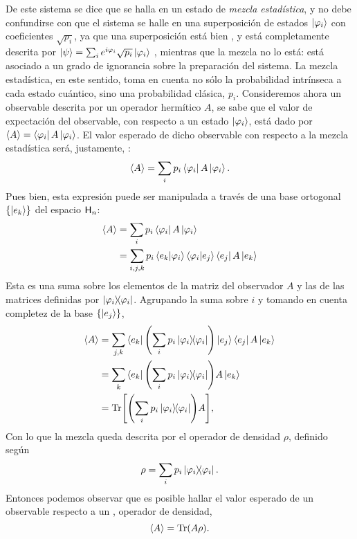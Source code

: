 De este sistema se dice que se halla en un estado de \textit{mezcla estadística}, y no debe confundirse con que el sistema se halle en una superposición de estados $\ket{\varphi_{i}}$ con coeficientes $\sqrt{p_{i}}$, ya que una superposición está bien , y está completamente descrita por $\ket{\psi}=\sum_{i} e^{i \varphi_i} \sqrt{p_{i}}\ket{\varphi_{i}}$ , mientras que la mezcla no lo está:  está asociado a un grado de ignorancia sobre la preparación del sistema. La mezcla estadística, en este sentido, toma en cuenta no sólo la probabilidad intrínseca a cada estado cuántico, sino una probabilidad clásica, $p_{i}$. Consideremos ahora un observable descrita por un operador hermítico $A$, se sabe que el valor de expectación del observable, con respecto a un estado $\ket{\varphi_{i}}$, está dado por $\expval{A}=\bra{\varphi_{i}}A\ket{\varphi_{i}}$. El valor esperado de dicho observable con respecto a la mezcla estadística será, justamente, :
\begin{equation*}
\expval{A}=\sum_{i}p_{i}\bra{\varphi_{i}}A\ket{\varphi_{i}}.
\end{equation*}
Pues bien, esta expresión puede ser manipulada a través de una base ortogonal $\{\ket{e_{k}}\}$ del espacio ${\sf H}_{n}$:
\begin{align*}
\expval{A}&=\sum_{i}p_{i}\bra{\varphi_{i}}A\ket{\varphi_{i}}\\
&=\sum_{i,j,k}p_{i}\bra{e_{k}}\ket{\varphi_{i}}\bra{\varphi_{i}}\ket{e_{j}} \bra{e_{j}}A\ket{e_{k}}\\
\end{align*}
Esta es una suma sobre los elementos de la matriz del observador $A$ y las de las matrices definidas por $\dyad{\varphi_{i}}$. Agrupando la suma sobre $i$ y tomando en cuenta completez de la base $\{\ket{e_{j}}\}$,
\begin{align*}
\expval{A}&=\sum_{j,k}\bra{e_{k}}\qty(\sum_{i}p_{i}\dyad{\varphi_{i}})\ket{e_{j}} \bra{e_{j}}A\ket{e_{k}}\\
&=\sum_{k}\bra{e_{k}}\qty(\sum_{i}p_{i}\dyad{\varphi_{i}})A\ket{e_{k}}\\
&=\Tr[\qty(\sum_{i}p_{i}\dyad{\varphi_{i}})A]\rlap{,}
\end{align*}
Con lo que la mezcla queda descrita por el operador de densidad $\rho$, definido según
\begin{equation}\label{eq:DensOpMix}
\rho=\sum_{i}p_{i}\dyad{\varphi_{i}}.
\end{equation}
Entonces podemos observar que es posible hallar el valor esperado de un observable respecto a un ,  operador de densidad, 
\begin{equation}\label{eq:ExpValFromDensOp}
\expval{A}=\Tr(A\rho).
\end{equation}

